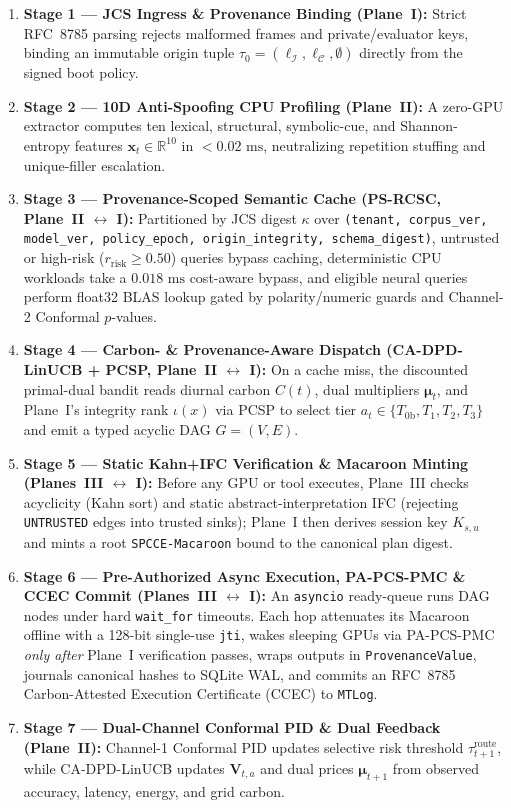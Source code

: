 \documentclass[10pt,twocolumn,letterpaper]{article}
\begin{document}
\begin{enumerate}\setlength{\itemsep}{0.8pt}\setlength{\topsep}{2pt}\setlength{\parsep}{0pt}
    \item \textbf{Stage 1 — JCS Ingress \& Provenance Binding (Plane~I):} Strict RFC~8785 parsing rejects malformed frames and private/evaluator keys, binding an immutable origin tuple $\tau_0 = (\ell_{\mathcal{I}}, \ell_{\mathcal{C}}, \emptyset)$ directly from the signed boot policy.
    \item \textbf{Stage 2 — 10D Anti-Spoofing CPU Profiling (Plane~II):} A zero-GPU extractor computes ten lexical, structural, symbolic-cue, and Shannon-entropy features $\mathbf{x}_t \in \mathbb{R}^{10}$ in $<0.02\text{ ms}$, neutralizing repetition stuffing and unique-filler escalation.
    \item \textbf{Stage 3 — Provenance-Scoped Semantic Cache (PS-RCSC, Plane~II $\leftrightarrow$ I):} Partitioned by JCS digest $\kappa$ over \texttt{(tenant, corpus\_ver, model\_ver, policy\_epoch, origin\_integrity, schema\_digest)}, untrusted or high-risk ($r_{\text{risk}} \ge 0.50$) queries bypass caching, deterministic CPU workloads take a $0.018\text{ ms}$ cost-aware bypass, and eligible neural queries perform float32 BLAS lookup gated by polarity/numeric guards and Channel-2 Conformal $p$-values.
    \item \textbf{Stage 4 — Carbon- \& Provenance-Aware Dispatch (CA-DPD-LinUCB + PCSP, Plane~II $\leftrightarrow$ I):} On a cache miss, the discounted primal-dual bandit reads diurnal carbon $C(t)$, dual multipliers $\boldsymbol{\mu}_t$, and Plane~I's integrity rank $\iota(x)$ via PCSP to select tier $a_t \in \{T_{0\text{b}}, T_1, T_2, T_3\}$ and emit a typed acyclic DAG $G=(V,E)$.
    \item \textbf{Stage 5 — Static Kahn+IFC Verification \& Macaroon Minting (Planes~III $\leftrightarrow$ I):} Before any GPU or tool executes, Plane~III checks acyclicity (Kahn sort) and static abstract-interpretation IFC (rejecting \texttt{UNTRUSTED} edges into trusted sinks); Plane~I then derives session key $K_{s,u}$ and mints a root \texttt{SPCCE-Macaroon} bound to the canonical plan digest.
    \item \textbf{Stage 6 — Pre-Authorized Async Execution, PA-PCS-PMC \& CCEC Commit (Planes~III $\leftrightarrow$ I):} An \texttt{asyncio} ready-queue runs DAG nodes under hard \texttt{wait\_for} timeouts. Each hop attenuates its Macaroon offline with a 128-bit single-use \texttt{jti}, wakes sleeping GPUs via PA-PCS-PMC \emph{only after} Plane~I verification passes, wraps outputs in \texttt{ProvenanceValue}, journals canonical hashes to SQLite WAL, and commits an RFC~8785 Carbon-Attested Execution Certificate (CCEC) to \texttt{MTLog}.
    \item \textbf{Stage 7 — Dual-Channel Conformal PID \& Dual Feedback (Plane~II):} Channel-1 Conformal PID updates selective risk threshold $\tau_{t+1}^{\text{route}}$, while CA-DPD-LinUCB updates $\mathbf{V}_{t,a}$ and dual prices $\boldsymbol{\mu}_{t+1}$ from observed accuracy, latency, energy, and grid carbon.
\end{enumerate}
\end{document}

